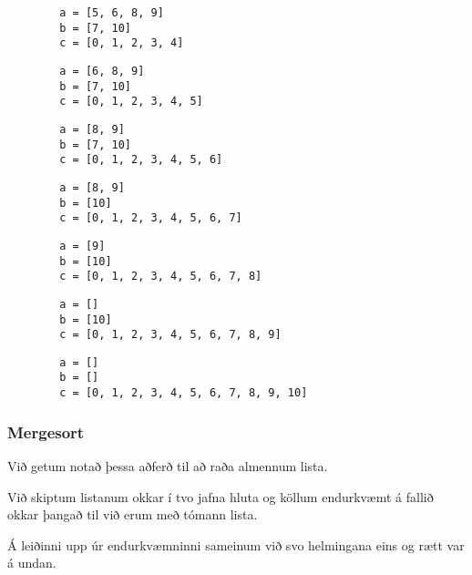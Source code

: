 \begin{frame}[fragile]
\begin{verbatim}
        a = [5, 6, 8, 9]
        b = [7, 10]
        c = [0, 1, 2, 3, 4]
\end{verbatim}
\end{frame}
\addtocounter{framenumber}{-1}

\begin{frame}[fragile]
\begin{verbatim}
        a = [6, 8, 9]
        b = [7, 10]
        c = [0, 1, 2, 3, 4, 5]
\end{verbatim}
\end{frame}
\addtocounter{framenumber}{-1}

\begin{frame}[fragile]
\begin{verbatim}
        a = [8, 9]
        b = [7, 10]
        c = [0, 1, 2, 3, 4, 5, 6]
\end{verbatim}
\end{frame}
\addtocounter{framenumber}{-1}

\begin{frame}[fragile]
\begin{verbatim}
        a = [8, 9]
        b = [10]
        c = [0, 1, 2, 3, 4, 5, 6, 7]
\end{verbatim}
\end{frame}
\addtocounter{framenumber}{-1}

\begin{frame}[fragile]
\begin{verbatim}
        a = [9]
        b = [10]
        c = [0, 1, 2, 3, 4, 5, 6, 7, 8]
\end{verbatim}
\end{frame}
\addtocounter{framenumber}{-1}

\begin{frame}[fragile]
\begin{verbatim}
        a = []
        b = [10]
        c = [0, 1, 2, 3, 4, 5, 6, 7, 8, 9]
\end{verbatim}
\end{frame}
\addtocounter{framenumber}{-1}

\begin{frame}[fragile]
\begin{verbatim}
        a = []
        b = []
        c = [0, 1, 2, 3, 4, 5, 6, 7, 8, 9, 10]
\end{verbatim}
\end{frame}

{
	\frametitle{Mergesort}
	{
		\item<1-> Við getum notað þessa aðferð til að raða almennum lista.
		\item<2-> Við skiptum listanum okkar í tvo jafna hluta og köllum endurkvæmt á fallið okkar þangað til við erum með tómann lista.
		\item<3-> Á leiðinni upp úr endurkvæmninni sameinum við svo helmingana eins og rætt var á undan.
	}
}

